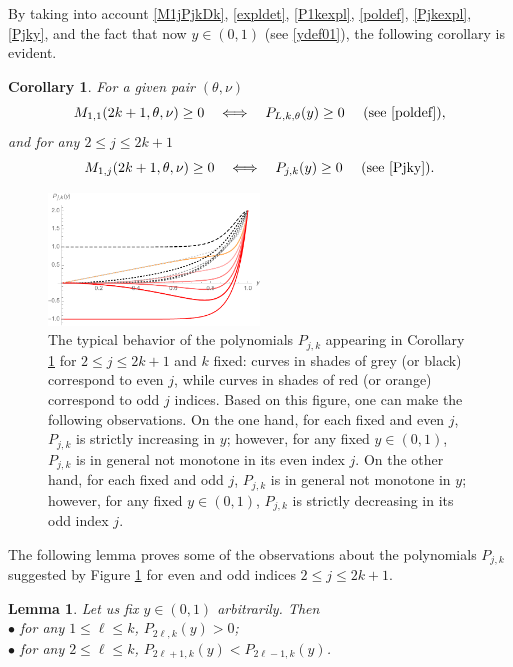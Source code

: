 \documentclass[a4paper]{article}
\newtheorem{lemma}{Lemma}
\newtheorem{corollary}{Corollary}
\newcommand{\te}{\theta}
\newcommand{\Pol}{P_{L,k,\te}(y)}
\begin{document}
By taking into account \eqref{M1jPjkDk}, \eqref{expldet}, \eqref{P1kexpl}, \eqref{poldef}, \eqref{Pjkexpl}, \eqref{Pjky}, and the fact that now $y\in(0,1)$ (see \eqref{ydef01}), the following corollary is evident.
\begin{corollary}\label{cor2} For a given pair $(\te,\nu)$
\[
M_{1,1}(2k+1,\te,\nu)\ge 0 \quad \Longleftrightarrow \quad \Pol\ge 0\quad\text{ (see } \eqref{poldef}\text{)},
\]
and for any $2\le j\le 2k+1$
\[
M_{1,j}(2k+1,\te,\nu)\ge 0 \quad \Longleftrightarrow \quad P_{j,k}(y)\ge 0\quad\text{ (see } \eqref{Pjky}\text{)}.
\]
\end{corollary}
\begin{figure}
\begin{center}
\includegraphics[width=0.5\textwidth]{fig_excepttopleft.pdf}
\caption{The typical behavior of the polynomials $P_{j,k}$ appearing in Corollary \ref{cor2} for $2\le j\le 2k+1$ and $k$ fixed: curves in shades of grey (or black) correspond to even $j$, while curves in shades of red (or orange) correspond to odd $j$ indices. Based on this figure, one can make the following observations. On the one hand, for each fixed and even $j$, $P_{j,k}$ is strictly increasing in $y$; however, for any fixed $y\in(0,1)$, $P_{j,k}$ is in general not monotone in its even index $j$. On the other hand, for each fixed and odd $j$, $P_{j,k}$ is in general not monotone in $y$; however, for any fixed $y\in(0,1)$, $P_{j,k}$ is strictly decreasing in its odd index $j$.}\label{fig_excepttopleft}
\end{center}
\end{figure}
The following lemma proves some of the observations about the polynomials $P_{j,k}$ suggested by Figure \ref{fig_excepttopleft} for even and odd indices $2\le j\le 2k+1$.
\begin{lemma}\label{lem2} Let us fix $y\in(0,1)$ arbitrarily. Then\\
\indent $\bullet$ for any $1\le\ell\le k$, $P_{2\ell,k}(y)>0$;\\
\indent $\bullet$ for any $2\le\ell\le k$, $P_{2\ell+1,k}(y)<P_{2\ell-1,k}(y)$. 
\end{lemma}
\end{document}

